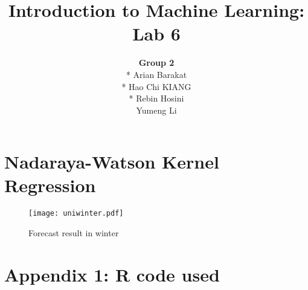 \documentclass[11pt,english]{article}
\begin{document}
\author{\textbf{Group 2} \\* Arian Barakat \\* Hao Chi KIANG \\* Rebin Hosini \\ Yumeng Li}
\title{Introduction to Machine Learning: Lab 6}
\maketitle

\section*{Nadaraya-Watson Kernel Regression}

\begin{figure}[H]
  \centering
  \texttt{[image: uniwinter.pdf]}
  \caption{Forecast result in winter}
  \label{uniwinter}
\end{figure}


\newpage
{}

\newpage
\section*{Appendix 1: R code used}
\label{ax2}

\end{document}
